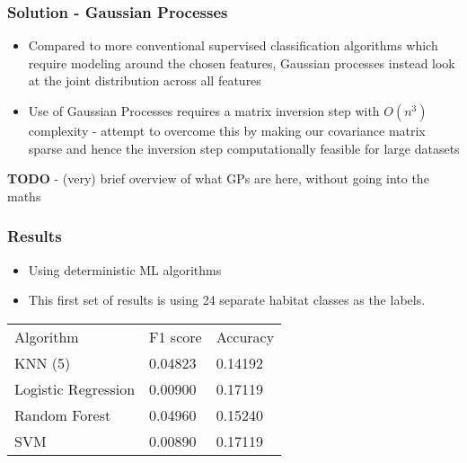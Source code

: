 \documentclass{beamer}
\begin{document}
\begin{frame}
    \frametitle{Solution - Gaussian Processes}
    \begin{itemize}
        \item Compared to more conventional supervised classification algorithms which require modeling around the chosen features, Gaussian processes instead look at the joint distribution across all features
        \item Use of Gaussian Processes requires a matrix inversion step with $O(n^3)$ complexity - attempt to overcome this by making our covariance matrix sparse and hence the inversion step computationally feasible for large datasets
    \end{itemize}
    \textbf{TODO} - (very) brief overview of what GPs are here, without going into the maths
\end{frame}

\begin{frame}
    \frametitle{Results}

    \begin{itemize}
        \item Using deterministic ML algorithms
        \item This first set of results is using 24 separate habitat classes as the labels.
    \end{itemize}

    \begin{tabular}{l | l | l}
        Algorithm & F1 score & Accuracy \\
        KNN (5) & 0.04823 &  0.14192 \\
        Logistic Regression & 0.00900 & 0.17119 \\
        Random Forest & 0.04960 &  0.15240 \\
        SVM & 0.00890 & 0.17119 \\
    \end{tabular}

\end{frame}
\end{document}
